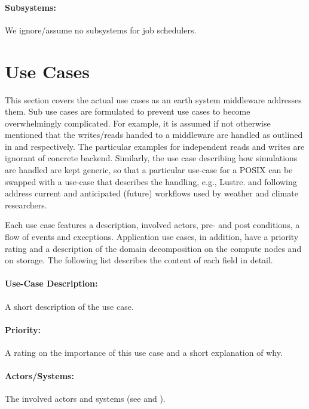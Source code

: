 \paragraph{Subsystems:}
We ignore/assume no subsystems for job schedulers.





\section{Use Cases}
\label{sec:use cases/use cases}

This section covers the actual use cases as an earth system middleware addresses them.
Sub use cases are formulated to prevent use cases to become overwhelmingly complicated.
For example, it is assumed if not otherwise mentioned that the writes/reads handed to a middleware are handled as outlined in  and  respectively.
The particular examples for independent reads and writes are ignorant of concrete backend.
Similarly, the use case describing how simulations are handled are kept generic, so that a particular use-case for a POSIX can be swapped with a use-case that describes the handling, e.g., Lustre.
 and following address current and anticipated (future) workflows used by weather and climate researchers.

Each use case features a description, involved actors, pre- and post conditions, a flow of events and exceptions.
Application use cases, in addition, have a priority rating and a description of the domain decomposition on the compute nodes and on storage.
The following list describes the content of each field in detail.


\paragraph{Use-Case Description:} A short description of the use case.

\paragraph{Priority:} A rating on the importance of this use case and a short explanation of why.

\paragraph{Actors/Systems:} The involved actors and systems (see and ).

